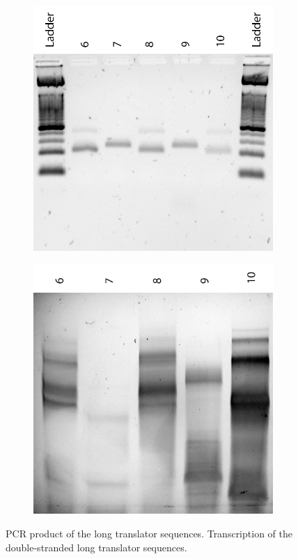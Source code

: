 \begin{figure}[h]
\begin{subfigure}[t]{0.53\textwidth}
  \includegraphics[width=\textwidth]{images/translator_pcr_long_1.png}
  \caption{}
  \label{translator_pcr_long_1}
\end{subfigure}
\begin{subfigure}[t]{0.47\textwidth}
  \includegraphics[width=\textwidth]{images/translator_transcription_long_ds_1.png}
  \caption{}
  \label{translator_transcription_long_ds_1}
\end{subfigure}
\caption{ PCR product of the long translator sequences.  Transcription of the double-stranded long translator sequences.}
\end{figure}

